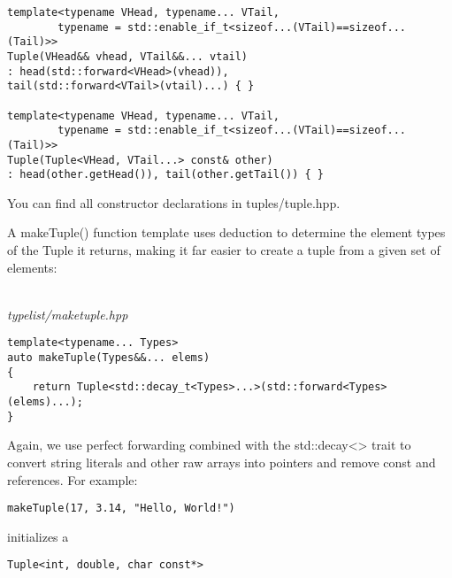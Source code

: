 \begin{lstlisting}[style=styleCXX]
template<typename VHead, typename... VTail,
		typename = std::enable_if_t<sizeof...(VTail)==sizeof...(Tail)>>
Tuple(VHead&& vhead, VTail&&... vtail)
: head(std::forward<VHead>(vhead)),
tail(std::forward<VTail>(vtail)...) { }

template<typename VHead, typename... VTail,
		typename = std::enable_if_t<sizeof...(VTail)==sizeof...(Tail)>>
Tuple(Tuple<VHead, VTail...> const& other)
: head(other.getHead()), tail(other.getTail()) { }
\end{lstlisting}

You can find all constructor declarations in tuples/tuple.hpp.

A makeTuple() function template uses deduction to determine the element types of the Tuple it returns, making it far easier to create a tuple from a given set of elements:

\hspace*{\fill} \\ %
\noindent
\textit{typelist/maketuple.hpp}
\begin{lstlisting}[style=styleCXX]
template<typename... Types>
auto makeTuple(Types&&... elems)
{
	return Tuple<std::decay_t<Types>...>(std::forward<Types>(elems)...);
}
\end{lstlisting}

Again, we use perfect forwarding combined with the std::decay<> trait to convert string literals and other raw arrays into pointers and remove const and references. For example:

\begin{lstlisting}[style=styleCXX]
makeTuple(17, 3.14, "Hello, World!")
\end{lstlisting}

initializes a

\begin{lstlisting}[style=styleCXX]
Tuple<int, double, char const*>
\end{lstlisting}







